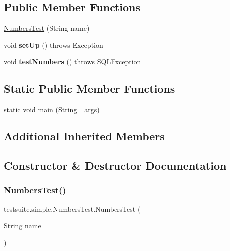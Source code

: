 \subsection*{Public Member Functions}
\begin{DoxyCompactItemize}
\item 
\mbox{\hyperlink{classtestsuite_1_1simple_1_1_numbers_test_adad110f92c704d82cdbaa52ed9626573}{Numbers\+Test}} (String name)
\item 
\mbox{\label{classtestsuite_1_1simple_1_1_numbers_test_a6cdec77fd619aab7060428194f75d50b}} 
void {\bfseries set\+Up} ()  throws Exception 
\item 
\mbox{\label{classtestsuite_1_1simple_1_1_numbers_test_aecceecbd6a68dcd409c3553f1a0e210e}} 
void {\bfseries test\+Numbers} ()  throws S\+Q\+L\+Exception 
\end{DoxyCompactItemize}
\subsection*{Static Public Member Functions}
\begin{DoxyCompactItemize}
\item 
static void \mbox{\hyperlink{classtestsuite_1_1simple_1_1_numbers_test_a71ce4bec6ea91a72a2818b53e626d99b}{main}} (String\mbox{[}$\,$\mbox{]} args)
\end{DoxyCompactItemize}
\subsection*{Additional Inherited Members}


\subsection{Constructor \& Destructor Documentation}
\mbox{\label{classtestsuite_1_1simple_1_1_numbers_test_adad110f92c704d82cdbaa52ed9626573}} 
\subsubsection{\texorpdfstring{Numbers\+Test()}{NumbersTest()}}
{\footnotesize\ttfamily testsuite.\+simple.\+Numbers\+Test.\+Numbers\+Test (\begin{DoxyParamCaption}\item[{String}]{name }\end{DoxyParamCaption})}

